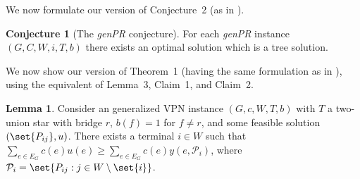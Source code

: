 \documentclass[11pt]{article}
\theoremstyle{definition}
\newtheorem{conjecture}{Conjecture}
\newtheorem{lemma}{Lemma}
\begin{document}
    We now formulate our version of Conjecture~2 (as in \cite{grandoni2008short}).
    \renewcommand\theconjecture{2}
    \begin{conjecture}[The \emph{genPR} conjecture]
        For each \emph{genPR} instance $(G, C, W, i, T, b)$ there exists an optimal solution which is a tree solution.
    \end{conjecture}

    We now show our version of Theorem~1 (having the same formulation as in \cite{grandoni2008short}), using the equivalent of Lemma~3, Claim~1, and Claim~2.

    \renewcommand\thelemma{3}
    \begin{lemma}
        Consider an generalized VPN instance $(G, c, W, T, b)$ with $T$ a two-union star with bridge $r$, $b(f) = 1$ for $f \neq r$, and some feasible solution $(\set{P_{ij}}, u)$.
        There exists a terminal $i \in W$ such that $\sum_{e \in E_G} c(e) u(e) \ge \sum_{e \in E_G} c(e) y(e, \mathcal P_i)$, where $\mathcal P_i = \set{P_{ij} : j \in W \setminus \set{i}}$.
    \end{lemma}
\end{document}
